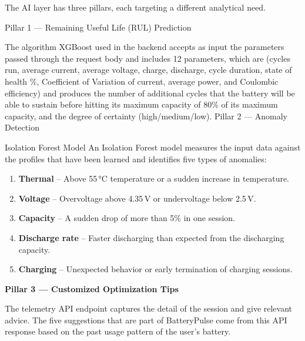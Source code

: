 \documentclass[12pt,a4paper]{report}
\begin{document}
The AI layer has three pillars, each targeting a different analytical need.

Pillar 1 — Remaining Useful Life (RUL) Prediction

The algorithm XGBoost used in the backend accepts as input the parameters passed through the request body and includes 12 parameters, which are (cycles run, average current, average voltage, charge, discharge, cycle duration, state of health \%, Coefficient of Variation of current, average power, and Coulombic efficiency) and produces the number of additional cycles that the battery will be able to sustain before hitting its maximum capacity of 80\% of its maximum capacity, and the degree of certainty (high/medium/low).
Pillar 2 — Anomaly Detection

Isolation Forest Model
An Isolation Forest model measures the input data against the profiles that have been learned and identifies five types of anomalies:
\begin{enumerate}[leftmargin=1.5em]
    \item \textbf{Thermal} – Above 55\,°C temperature or a sudden increase in temperature.
    \item \textbf{Voltage} – Overvoltage above 4.35\,V or undervoltage below 2.5\,V.
    \item \textbf{Capacity} – A sudden drop of more than 5\% in one session.
    \item \textbf{Discharge rate} – Faster discharging than expected from the discharging capacity.
    \item \textbf{Charging} – Unexpected behavior or early termination of charging sessions.
\end{enumerate}
\textbf{Pillar 3 — Customized Optimization Tips}

The telemetry API endpoint captures the detail of the session and give relevant advice.
The five suggestions that are part of BatteryPulse come from this API response
based on the past usage pattern of the user’s battery.
\end{document}
